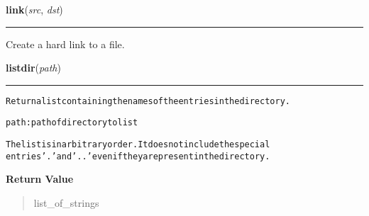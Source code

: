     \label{os:link}

    \vspace{0.5ex}

\hspace{.8\funcindent}\begin{boxedminipage}{\funcwidth}

    \raggedright \textbf{link}(\textit{src}, \textit{dst})

    \vspace{-1.5ex}

    \rule{\textwidth}{0.5\fboxrule}
\setlength{\parskip}{2ex}
    Create a hard link to a file.

\setlength{\parskip}{1ex}
    \end{boxedminipage}

    \label{os:listdir}

    \vspace{0.5ex}

\hspace{.8\funcindent}\begin{boxedminipage}{\funcwidth}

    \raggedright \textbf{listdir}(\textit{path})

    \vspace{-1.5ex}

    \rule{\textwidth}{0.5\fboxrule}
\setlength{\parskip}{2ex}
\begin{alltt}
Return a list containing the names of the entries in the directory.

    path: path of directory to list

The list is in arbitrary order.  It does not include the special
entries '.' and '..' even if they are present in the directory.
\end{alltt}

\setlength{\parskip}{1ex}
      \textbf{Return Value}
    \vspace{-1ex}

      \begin{quote}
      list\_of\_strings

      \end{quote}

    \end{boxedminipage}

    \label{os:lseek}

    \vspace{0.5ex}

